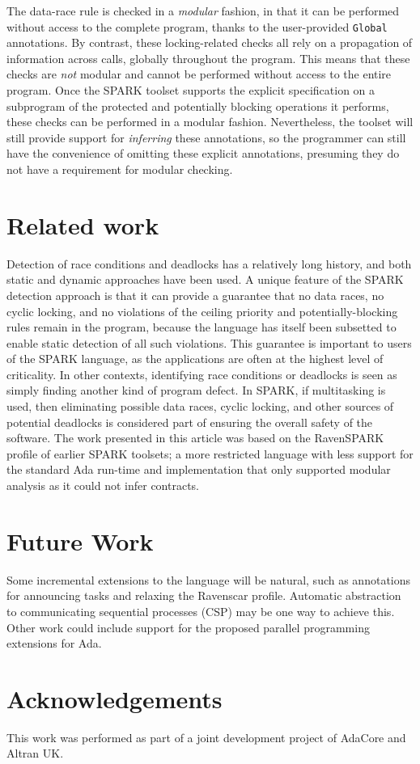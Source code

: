 \documentclass[10pt,conference,compsocconf]{IEEEtran}
\begin{document}
The data-race rule is checked in a \emph{modular} fashion, in that it can
be performed without access to the complete program, thanks to the
user-provided \verb|Global| annotations. By contrast, these locking-related
checks all rely on a propagation of information across calls, globally
throughout the program. This means that these checks are \emph{not} modular
and cannot be performed without access to the entire program. Once the
SPARK toolset supports the explicit specification on a subprogram of the
protected and potentially blocking operations it performs, these checks can
be performed in a modular fashion. Nevertheless, the toolset will still
provide support for \emph{inferring} these annotations, so the programmer
can still have the convenience of omitting these explicit annotations,
presuming they do not have a requirement for modular checking.

\section{Related work}
Detection of race conditions and deadlocks has a relatively long history,
and both static \cite{engler2003racerx} and dynamic \cite{yu2005racetrack}
approaches have been used. A unique feature of the SPARK detection approach
is that it can provide a guarantee that no data races, no cyclic locking,
and no violations of the ceiling priority and potentially-blocking rules
remain in the program, because the language has itself been subsetted to
enable static detection of all such violations. This guarantee is important
to users of the SPARK language, as the applications are often at the
highest level of criticality. In other contexts, identifying race
conditions or deadlocks is seen as simply finding another kind of program
defect. In SPARK, if multitasking is used, then eliminating possible data
races, cyclic locking, and other sources of potential deadlocks is
considered part of ensuring the overall safety of the software. The work
presented in this article was based on the RavenSPARK \cite{ravenspark}
profile of earlier SPARK toolsets; a more restricted language with less
support for the standard Ada run-time and implementation that only
supported modular analysis as it could not infer contracts.

\section{Future Work}
Some incremental extensions to the language will be natural, such as
annotations for announcing tasks and relaxing the Ravenscar profile.
Automatic abstraction to communicating sequential processes (CSP) may be
one way to achieve this. Other work could include support for the proposed
parallel programming extensions \cite{parallelada} for Ada.

\section*{Acknowledgements}
This work was performed as part of a joint development project of AdaCore
and Altran UK.



\end{document}
